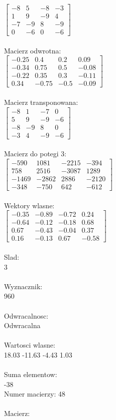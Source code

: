 \documentclass[a4paper,12pt]{article}
\begin{document}
$\begin{bmatrix} -8&5&-8&-3\\1&9&-9&4\\-7&-9&8&-9\\0&-6&0&-6 \end{bmatrix}$
\\
\\
Macierz odwrotna:\\

$\begin{bmatrix} -0.25&0.4&0.2&0.09\\-0.34&0.75&0.5&-0.08\\-0.22&0.35&0.3&-0.11\\0.34&-0.75&-0.5&-0.09 \end{bmatrix}$
\\
\\
Macierz transponowana:\\

$\begin{bmatrix} -8&1&-7&0\\5&9&-9&-6\\-8&-9&8&0\\-3&4&-9&-6 \end{bmatrix}$
\\
\\
Macierz do potegi 3:\\

$\begin{bmatrix} -590&1081&-2215&-394\\758&2516&-3087&1289\\-1469&-2862&2886&-2120\\-348&-750&642&-612 \end{bmatrix}$
\\
\\
Wektory wlasne:\\

$\begin{bmatrix} -0.35&-0.89&-0.72&0.24\\-0.64&-0.12&-0.18&0.68\\0.67&-0.43&-0.04&0.37\\0.16&-0.13&0.67&-0.58 \end{bmatrix}$
\\
\\
Slad:\\
3
\\
\\
Wyznacznik:\\
960
\\
\\
Odwracalnosc:\\
Odwracalna
\\
\\
Wartosci wlasne:\\
18.03 -11.63 -4.43 1.03
\\
\\
Suma elementow:\\
-38
\\
\newpage
Numer macierzy:
48
\\
\\
Macierz:\\
\end{document}
